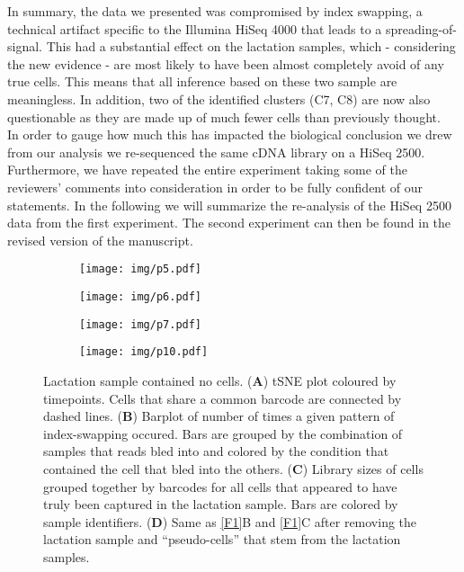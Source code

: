 \documentclass{article}
\begin{document}
In summary, the data we presented was compromised by index swapping, a technical artifact specific to the Illumina HiSeq 4000 that leads to a spreading-of-signal.
This had a substantial effect on the lactation samples, which - considering the new evidence - are most likely to have been almost completely avoid of any true cells.
This means that all inference based on these two sample are meaningless. 
In addition, two of the identified clusters (C7, C8) are now also questionable as they are made up of much fewer cells than previously thought.\\
In order to gauge how much this has impacted the biological conclusion we drew from our analysis we re-sequenced the same cDNA library on a HiSeq 2500.
Furthermore, we have repeated the entire experiment taking some of the reviewers' comments into consideration in order to be fully confident of our statements.
In the following we will summarize the re-analysis of the HiSeq 2500 data from the first experiment.
The second experiment can then be found in the revised version of the manuscript.




\begin{figure}
    \begin{subfigure}[c]{0.5\textwidth}
	\texttt{[image: img/p5.pdf]}
    \caption{}
    \end{subfigure}
    \begin{subfigure}[c]{0.5\textwidth}
	\texttt{[image: img/p6.pdf]}
    \caption{}
    \end{subfigure}
    \begin{subfigure}[c]{0.5\textwidth}
	\texttt{[image: img/p7.pdf]}
    \caption{}
    \end{subfigure}
    \begin{subfigure}[c]{0.5\textwidth}
	\texttt{[image: img/p10.pdf]}
    \caption{}
    \end{subfigure}
    \caption{Lactation sample contained no cells.
	(\textbf{A}) tSNE plot coloured by timepoints.
	Cells that share a common barcode are connected by dashed lines.
	(\textbf{B}) Barplot of number of times a given pattern of index-swapping occured.
	Bars are grouped by the combination of samples that reads bled into and colored by the condition that contained the cell that bled into the others.
	(\textbf{C}) Library sizes of cells grouped together by barcodes for all cells that appeared to have truly been captured in the lactation sample.
	Bars are colored by sample identifiers.
	(\textbf{D}) Same as \autoref{F1}B and \autoref{F1}C after removing the lactation sample and ``pseudo-cells'' that stem from the lactation samples.
    }
    \label{F3}
\end{figure}
\end{document}
